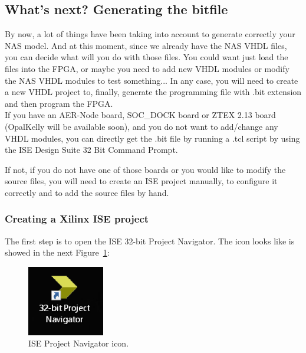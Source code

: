 
\subsection{What's next? Generating the bitfile}

By now, a lot of things have been taking into account to generate correctly your NAS model. And at this moment, since we already have the NAS VHDL files, you can decide what will you do with those files. You could want just load the files into the FPGA, or maybe you need to add new VHDL modules or modify the NAS VHDL modules to test something... In any case, you will need to create a new VHDL project to, finally, generate the programming file with .bit extension and then program the FPGA.\\

If you have an AER-Node board, SOC\_DOCK board or ZTEX 2.13 board (OpalKelly will be available soon), and you do not want to add/change any VHDL modules, you can directly get the .bit file by running a .tcl script by using the ISE Design Suite 32 Bit Command Prompt.

If not, if you do not have one of those boards or you would like to modify the source files, you will need to create an ISE project manually, to configure it correctly and to add the source files by hand.

\subsubsection{Creating a Xilinx ISE project}

The first step is to open the ISE 32-bit Project Navigator. The icon looks like is showed in the next Figure~\ref{fig:ISE_icon}:

\begin{figure}[H]
\centering
\includegraphics[width=0.3\textwidth]{images/Img26_FindISE.PNG}
\caption{\label{fig:ISE_icon}ISE Project Navigator icon.}
\end{figure}

